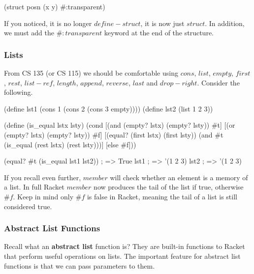 \begin{code}[Lisp]
(struct posn (x y) #:transparent)
\end{code}

If you noticed, it is no longer $define-struct$, it is now just $struct$. In addition, we must add the $\#:transparent$ keyword at the end of the structure.\\

\clearpage
{}

\subsubsection*{Lists}

From CS 135 (or CS 115) we should be comfortable using $cons$, $list$, $empty$, $first$, $rest$, $list-ref$, $length$, $append$, $reverse$, $last$ and $drop-right$. Consider the following.\\


\begin{code}[Lisp]
(define lst1 (cons 1 (cons 2 (cons 3 empty))))
(define lst2 (list 1 2 3))

(define (is_equal lstx lsty)
	(cond
		[(and (empty? lstx) (empty? lsty)) #t]
		[(or (empty? lstx) (empty? lsty)) #f]
		[(equal? (first lstx) (first lsty)) (and #t (is_equal (rest lstx)
		                                                      (rest lsty)))]
		[else #f]))
	
(equal? #t (is_equal lst1 lst2)) ; => True
lst1 ; => '(1 2 3)
lst2 ; => '(1 2 3)
\end{code}

If you recall even further, $member$ will check whether an element is a memory of a list. In full Racket $member$ now produces the tail of the list if true, otherwise $\#f$. Keep in mind only $\#f$ is false in Racket, meaning the tail of a list is still considered true.

\subsubsection*{Abstract List Functions}

Recall what an \textbf{abstract list} function is? They are built-in functions to Racket that perform useful operations on lists. The important feature for abstract list functions is that we can pass parameters to them.\\

